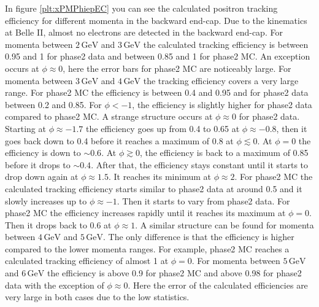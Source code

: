 \documentclass[a4paper,11pt,twosided,final,german,openbib,pdftex,listof=totoc,bibliography=totoc]{scrbook}
\begin{document}
In figure \ref{plt:xPMPhiepEC} you can see the calculated positron tracking efficiency for different momenta in the backward end-cap. 
Due to the kinematics at Belle II, almost no electrons are detected in the backward end-cap. For momenta between $2\,\textrm{GeV}$ and $3\,\textrm{GeV}$ the calculated tracking efficiency is between 0.95 and 1 for phase2 data and between 0.85 and 1 for phase2 MC. An exception occurs at $\phi \approx 0$, here the error bars for phase2 MC are noticeably large. 
For momenta between $3\,\textrm{GeV}$ and $4\,\textrm{GeV}$ the tracking efficiency covers a very large range. For phase2 MC the efficiency is between 0.4 and 0.95 and for phase2 data between 0.2 and 0.85. For $\phi <  -1$, the efficiency is slightly higher for phase2 data compared to phase2 MC. 
A strange structure occurs at $\phi \approx 0$ for phase2 data. Starting at  $\phi \approx -1.7$ the efficiency goes up from 0.4 to 0.65 at $\phi \approx -0.8$, then it goes back down to 0.4 before it reaches a maximum of 0.8 at $\phi \lesssim 0$.
At $\phi =0$ the efficiency is down to $\sim 0.6$. At $\phi \gtrsim 0$, the efficiency is back to a maximum of 0.85 before it drops to $\sim 0.4$.
After that, the efficiency stays constant until it starts to drop down again at $\phi \approx 1.5$. It reaches its minimum at $\phi \approx 2$.
For phase2 MC the calculated tracking efficiency starts similar to phase2 data at around 0.5 and it slowly increases up to $\phi \approx -1$. Then it starts to vary from phase2 data. For phase2 MC the efficiency  increases rapidly until it reaches its maximum at $\phi = 0$. Then it drops back to 0.6 at $\phi \approx 1$.
A similar structure can be found for momenta between $4\,\textrm{GeV}$ and $5\,\textrm{GeV}$. The only difference is that the efficiency is higher compared to the lower momenta ranges. For example, phase2 MC reaches a calculated tracking efficiency of almost 1 at $\phi =0$.
For momenta between $5\,\textrm{GeV}$ and $6\,\textrm{GeV}$ the efficiency is above 0.9 for  phase2 MC and above 0.98 for phase2 data with the exception of $\phi \approx 0$. Here the error of the calculated efficiencies are very large in both cases due to the low statistics.
\end{document}
